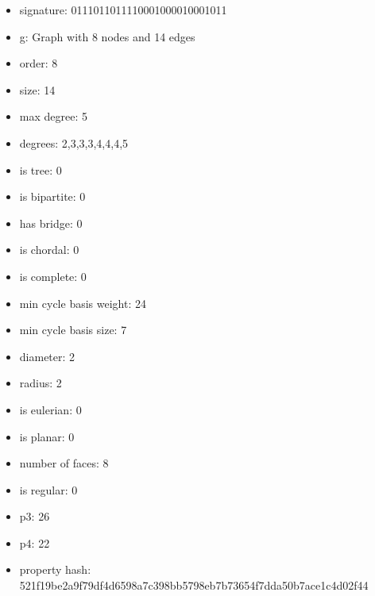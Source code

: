 \begin{itemize}
\item signature: 0111011011110001000010001011
\item g: Graph with 8 nodes and 14 edges
\item order: 8
\item size: 14
\item max degree: 5
\item degrees: 2,3,3,3,4,4,4,5
\item is tree: 0
\item is bipartite: 0
\item has bridge: 0
\item is chordal: 0
\item is complete: 0
\item min cycle basis weight: 24
\item min cycle basis size: 7
\item diameter: 2
\item radius: 2
\item is eulerian: 0
\item is planar: 0
\item number of faces: 8
\item is regular: 0
\item p3: 26
\item p4: 22
\item property hash: 521f19be2a9f79df4d6598a7c398bb5798eb7b73654f7dda50b7ace1c4d02f44
\end{itemize}
\newpage
\begin{figure}
\end{figure}
